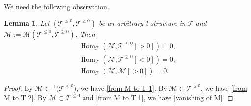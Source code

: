 \documentclass[a4paper,reqno]{amsart}
\newtheorem{lemma}[theorem]{Lemma}
\theoremstyle{definition}
\newcommand{\TT}{{\mathcal T}}
\newcommand{\MM}{{\mathcal M}}
\newcommand{\Z}{\mathbb{Z}}
\newcommand{\Hom}{\operatorname{Hom}\nolimits}
\begin{document}
We need the following observation.

\begin{lemma}
Let $(\TT^{\le0},\TT^{\ge0})$ be an arbitrary t-structure in $\TT$ and $\MM:=\MM(\TT^{\le0},\TT^{\ge0})$. Then
\begin{eqnarray}\label{from M to T 1}
\Hom_{\TT}(\MM,\TT^{\le0}[>0])=0,\\ \label{from M to T 2}
\Hom_{\TT}(\MM,\TT^{\ge0}[<0])=0,\\ \label{vanishing of M}
\Hom_{\TT}(\MM,\MM[>0])=0.
\end{eqnarray}
\end{lemma}

\begin{proof}
By $\MM\subset{}^\perp(\TT^{<0}$), we have \eqref{from M to T 1}.
By $\MM\subset\TT^{\le0}$, we have \eqref{from M to T 2}.
By $\MM\subset\TT^{\le0}$ and \eqref{from M to T 1}, we have \eqref{vanishing of M}.
\end{proof}

%
%
%
\end{document}
